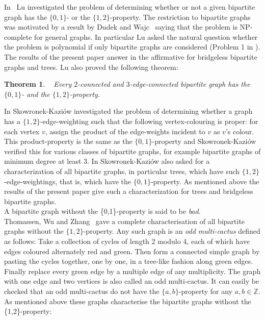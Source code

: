 \documentclass[
final,
 nomarks,
]{dmtcs-episciences}
\newtheorem{theorem}{Theorem}[]
\theoremstyle{definition}
\begin{document}
\noindent In~\cite{Lu} Lu investigated the problem of determining whether or not a given bipartite graph has the $\{0,1\}$- or the $\{1,2\}$-property.  The restriction to bipartite graphs was motivated by a result by Dudek and Wajc~\cite{DuWa} saying that the problem is \textsf{NP}-complete for general graphs. In particular Lu asked the natural question whether the problem is polynomial if only bipartite graphs are considered (Problem 1 in \cite{Lu}). The results of the present paper answer in the affirmative for bridgeless bipartite graphs and trees. Lu also proved the following theorem:
\begin{theorem}\emph{~\cite{Lu}} \label{thm:LU}
Every $2$-connected and $3$-edge-connected bipartite graph has the $\{0,1\}$- and the $\{1,2\}$-property.
\end{theorem}
\noindent In \cite{skow} Skowronek-Kazi\'{o}w investigated the problem of determining whether a graph has a $\{1,2\}$-edge-weighting such that the following vertex-colouring is proper: for each vertex $v$, assign the product of the edge-weights incident to $v$ as $v$'s colour. This product-property is the same as the $\{0,1\}$-property and Skowronek-Kazi\'{o}w verified this for various classes of bipartite graphs, for example bipartite graphs of minimum degree at least 3. In \cite{skow} Skowronek-Kazi\'{o}w also asked for a characterization of all bipartite graphs, in particular trees, which have such $\{1,2\}$-edge-weightings, that is, which have the $\{0,1\}$-property. As mentioned above the results of the present paper give such a characterization for trees and bridgeless bipartite graphs.\\
\noindent  A bipartite graph without the \{0,1\}-property is said to be \textit{bad}.  \\
Thomassen, Wu and Zhang~\cite{TWZ} gave a complete characterisation of all bipartite graphs without the $\{1,2\}$-property. Any such graph is an \textit{odd multi-cactus} defined as follows:
Take a collection of cycles of length 2 modulo 4, each of which have edges coloured alternately red and green. Then form a connected simple graph by pasting the cycles together, one by one, in a tree-like fashion along green edges. Finally replace every green edge by a multiple edge of any multiplicity. The graph with one edge and two vertices is also called an odd multi-cactus. It can easily be checked that an odd multi-cactus do not have the $\{a,b\}$-property for any $a,b \in \mathbb{Z}$. As mentioned above these graphs characterise the bipartite graphs without the \{1,2\}-property:
\end{document}
